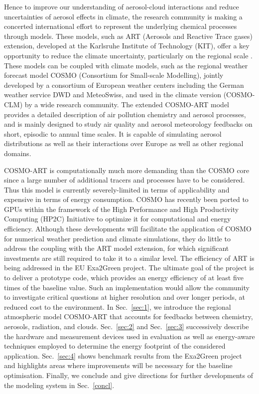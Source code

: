 Hence to  improve our understanding of  aerosol-cloud interactions and
reduce  uncertainties  of aerosol  effects  in  climate, the  research
community is making a  concerted international effort to represent the
underlying chemical  processes through models.  These  models, such as
ART (Aerosols  and Reactive Trace  gases) extension, developed  at the
Karlsruhe Institute  of Technology (KIT),  offer a key  opportunity to
reduce   the  climate  uncertainty,   particularly  on   the  regional
scale \citep{Knote-2011, Bangert-2011,  Knote-2013}.  These models can
be coupled with climate models,  such as the regional weather forecast
model COSMO (Consortium  for Small-scale Modelling), jointly developed
by  a consortium  of  European weather  centers  including the  German
weather service  DWD and MeteoSwiss,  and used in the  climate version
(COSMO-CLM)  by a  wide  research community.   The extended  COSMO-ART
model provides  a detailed description of air  pollution chemistry and
aerosol processes,  and is  mainly designed to  study air  quality and
aerosol  meteorology  feedbacks  on  short, episodic  to  annual  time
scales.  It is capable of  simulating aerosol distributions as well as
their interactions over Europe as well as other regional domains.

COSMO-ART is  computationally much more demanding than  the COSMO core
since a  large number of additional  tracers and processes  have to be
considered.  Thus this model is currently severely-limited in terms of
applicability and expensive in terms of energy consumption.  COSMO has
recently  been  ported  to  GPUs  within the  framework  of  the  High
Performance  and  High  Productivity  Computing (HP2C)  Initiative  to
optimize it  for computational and energy  efficiency.  Although these
developments will  facilitate the  application of COSMO  for numerical
weather prediction and climate  simulations, they do little to address
the  coupling with  the  ART model  extension,  for which  significant
investments  are still required  to take  it to  a similar  level. The
efficiency of ART is being  addressed in the EU Exa2Green project. The
ultimate goal  of the  project is to  deliver a prototype  code, which
provides an energy  efficiency of at least five  times of the baseline
value.   Such   an  implementation   would  allow  the   community  to
investigate critical  questions at  higher resolution and  over longer
periods, at reduced cost  to the environment.  In Sec.~\ref{sec:1}, we
introduce the regional  atmospheric model COSMO-ART \citep{Vogel-2009}
that  accounts for feedbacks  between chemistry,  aerosols, radiation,
and   clouds.   Sec.~\ref{sec:2}  and   Sec.~\ref{sec:3}  successively
describe the  hardware and measurement  devices used in  evaluation as
well  as  energy-aware techniques  employed  to  determine the  energy
footprint  of  the  considered  application.   Sec.~\ref{sec:4}  shows
benchmark  results from  the  Exa2Green project  and highlights  areas
where improvements  will be  necessary for the  baseline optimisation.
Finally, we  conclude and give directions for  further developments of
the modeling system in Sec.~\ref{concl}.

